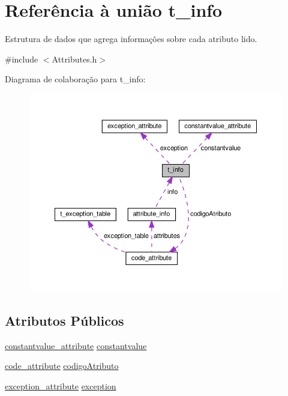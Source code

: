\hypertarget{uniont__info}{}\section{Referência à união t\+\_\+info}
\label{uniont__info}


Estrutura de dados que agrega informações sobre cada atributo lido.  




{\ttfamily \#include $<$Attributes.\+h$>$}



Diagrama de colaboração para t\+\_\+info\+:
\nopagebreak
\begin{figure}[H]
\begin{center}
\leavevmode
\includegraphics[width=350pt]{uniont__info__coll__graph}
\end{center}
\end{figure}
\subsection*{Atributos Públicos}
\begin{DoxyCompactItemize}
\item 
\hyperlink{structconstantvalue__attribute}{constantvalue\+\_\+attribute} \hyperlink{uniont__info_ab4a27f0438794e6a65bbdd9776fe657a}{constantvalue}
\item 
\hyperlink{structcode__attribute}{code\+\_\+attribute} \hyperlink{uniont__info_ad6e1a8b8fb7d8ded498685b35fbdc7fe}{codigo\+Atributo}
\item 
\hyperlink{structexception__attribute}{exception\+\_\+attribute} \hyperlink{uniont__info_ad8bba19df869f74ce8cb48ae37c3fff4}{exception}
\end{DoxyCompactItemize}


